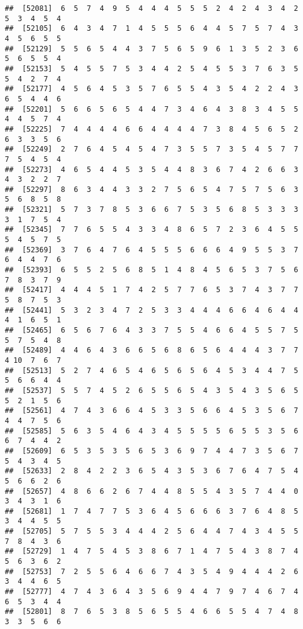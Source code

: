 \documentclass[
]{book}
\begin{document}
\begin{verbatim}
##  [52081]  6  5  7  4  9  5  4  4  4  5  5  5  2  4  2  4  3  4  2  5  3  4  5  4
##  [52105]  6  4  3  4  7  1  4  5  5  5  6  4  4  5  7  5  7  4  3  4  5  6  5  5
##  [52129]  5  5  6  5  4  4  3  7  5  6  5  9  6  1  3  5  2  3  6  5  6  5  5  4
##  [52153]  5  4  5  5  7  5  3  4  4  2  5  4  5  5  3  7  6  3  5  5  4  2  7  4
##  [52177]  4  5  6  4  5  3  5  7  6  5  5  4  3  5  4  2  2  4  3  6  5  4  4  6
##  [52201]  5  6  6  5  6  5  4  4  7  3  4  6  4  3  8  3  4  5  5  4  4  5  7  4
##  [52225]  7  4  4  4  4  6  6  4  4  4  4  7  3  8  4  5  6  5  2  6  3  3  5  6
##  [52249]  2  7  6  4  5  4  5  4  7  3  5  5  7  3  5  4  5  7  7  7  5  4  5  4
##  [52273]  4  6  5  4  4  5  3  5  4  4  8  3  6  7  4  2  6  6  3  4  3  2  2  7
##  [52297]  8  6  3  4  4  3  3  2  7  5  6  5  4  7  5  7  5  6  3  5  6  8  5  8
##  [52321]  5  7  3  7  8  5  3  6  6  7  5  3  5  6  8  5  3  3  3  3  1  7  5  4
##  [52345]  7  7  6  5  5  4  3  3  4  8  6  5  7  2  3  6  4  5  5  5  4  5  7  5
##  [52369]  3  7  6  4  7  6  4  5  5  5  6  6  6  4  9  5  5  3  7  6  4  4  7  6
##  [52393]  6  5  5  2  5  6  8  5  1  4  8  4  5  6  5  3  7  5  6  7  8  3  7  9
##  [52417]  4  4  4  5  1  7  4  2  5  7  7  6  5  3  7  4  3  7  7  5  8  7  5  3
##  [52441]  5  3  2  3  4  7  2  5  3  3  4  4  4  6  6  4  6  4  4  4  1  6  5  1
##  [52465]  6  5  6  7  6  4  3  3  7  5  5  4  6  6  4  5  5  7  5  5  7  5  4  8
##  [52489]  4  4  6  4  3  6  6  5  6  8  6  5  6  4  4  4  3  7  7  4 10  7  6  7
##  [52513]  5  2  7  4  6  5  4  6  5  6  5  6  4  5  3  4  4  7  5  5  6  6  4  4
##  [52537]  5  5  7  4  5  2  6  5  5  6  5  4  3  5  4  3  5  6  5  5  2  1  5  6
##  [52561]  4  7  4  3  6  6  4  5  3  3  5  6  6  4  5  3  5  6  7  4  4  7  5  6
##  [52585]  5  6  3  5  4  6  4  3  4  5  5  5  5  6  5  5  3  5  6  6  7  4  4  2
##  [52609]  6  5  3  5  3  5  6  5  3  6  9  7  4  4  7  3  5  6  7  5  4  3  4  5
##  [52633]  2  8  4  2  2  3  6  5  4  3  5  3  6  7  6  4  7  5  4  5  6  6  2  6
##  [52657]  4  8  6  6  2  6  7  4  4  8  5  5  4  3  5  7  4  4  0  3  4  3  1  6
##  [52681]  1  7  4  7  7  5  3  6  4  5  6  6  6  3  7  6  4  8  5  3  4  4  5  5
##  [52705]  5  7  5  5  3  4  4  4  2  5  6  4  4  7  4  3  4  5  5  7  8  4  3  6
##  [52729]  1  4  7  5  4  5  3  8  6  7  1  4  7  5  4  3  8  7  4  5  6  3  6  2
##  [52753]  7  2  5  5  6  4  6  6  7  4  3  5  4  9  4  4  4  2  6  3  4  4  6  5
##  [52777]  4  7  4  3  6  4  3  5  6  9  4  4  7  9  7  4  6  7  4  6  5  3  4  4
##  [52801]  8  7  6  5  3  8  5  6  5  5  4  6  6  5  5  4  7  4  8  3  3  5  6  6

\end{verbatim}
\end{document}
